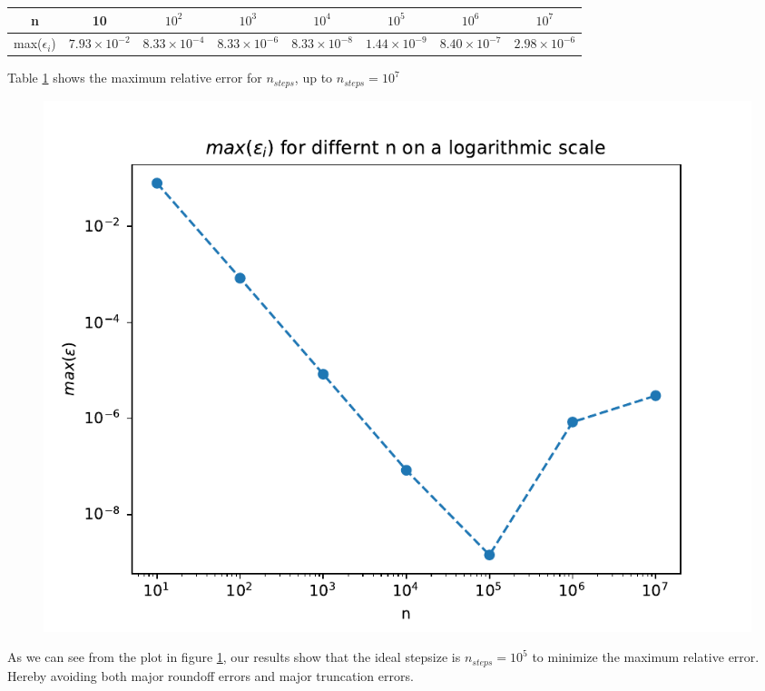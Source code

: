 \documentclass[english,notitlepage]{revtex4-1}  %
\begin{document}
\begin{enumerate}[label= \alph*)]
\begin{table}
    \label{tab:table}
    \begin{tabular}{|c|c|c|c|c|c|c|c|}
      \hline
      n  & 10 & $10^2$ & $10^3$ & $10^4$ & $10^5$& $10^6$ &$10^7$ \\
      \hline
      max($\epsilon_i$) &
      $7.93\times 10^{-2}$ &
      $8.33\times 10^{-4}$ &
      $8.33\times10^{-6}$  &
      $8.33\times10^{-8}$ &
      $1.44\times10^{-9}$  &
      $8.40\times10^{-7}$  &
      $2.98\times10^{-6}$\\
      \hline
    \end{tabular}
  \end{table}
  Table \ref{tab:table} shows the maximum relative error for $n_{steps}$, up to $n_{steps} = 10^7$


  \begin{figure}[H]
    \centering
    \includegraphics[width=.7\textwidth]{../figures/max_rel_error.pdf}
    \caption{}
    \label{fig:max_rel_error}
  \end{figure}
As we can see from the plot in figure \ref{fig:max_rel_error}, our results show that the ideal stepsize is $n_{steps} = 10^5$ to minimize the maximum relative error. Hereby avoiding both major roundoff errors and major truncation errors.
\end{enumerate}
\end{document}
